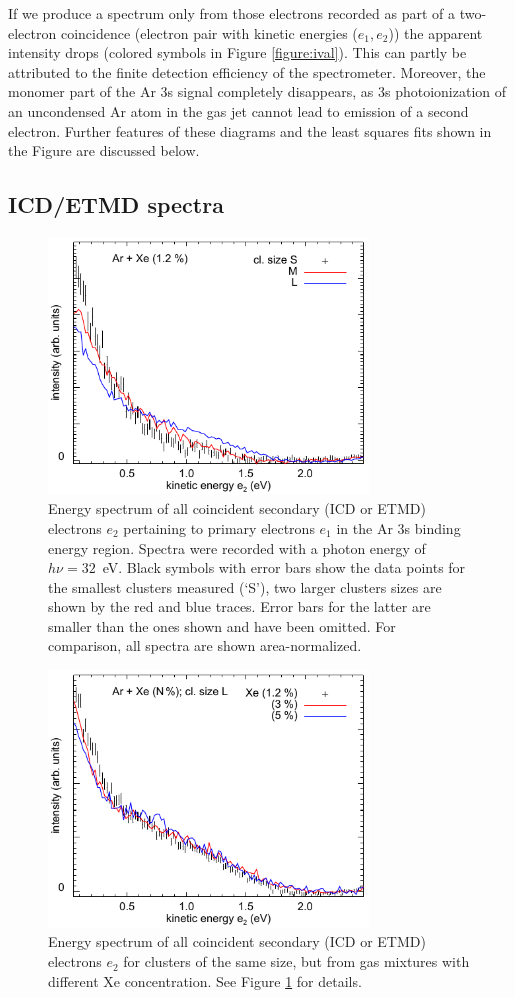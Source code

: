 If we produce a spectrum only from those electrons recorded as part of a two-electron coincidence (electron pair with kinetic energies ($e_1,e_2$)) the apparent intensity drops (colored symbols in Figure \ref{figure:ival}).
This can partly be attributed to the finite detection efficiency of the spectrometer. 
Moreover, the monomer part of the Ar 3s signal completely disappears, as 3s photoionization of an uncondensed Ar atom in the gas jet cannot lead to emission of a second electron. 
Further features of these diagrams and the least squares fits shown in the Figure are discussed below.
%
%
\subsection{ICD/ETMD spectra}
%
\begin{figure}[ht]
 \centering
 \includegraphics[width=8.5cm]{pics/figure_icd_12.pdf}
 \caption{
Energy spectrum of all coincident secondary (ICD or ETMD) electrons $e_2$ pertaining to primary electrons $e_1$ in the Ar 3s binding energy region. 
Spectra were recorded with a photon energy of $h\nu = 32$~eV. 
Black symbols with error bars show the data points for the smallest clusters measured (`S'), two larger clusters sizes are shown by the red and blue traces. 
Error bars for the latter are smaller than the ones shown and have been omitted.
For comparison, all spectra are shown area-normalized. 
}
 \label{figure:icd_12}
\end{figure}
%
%
\begin{figure}[ht]
 \centering
 \includegraphics[width=8.5cm]{pics/figure_icd_l.pdf}
 \caption{
Energy spectrum of all coincident secondary (ICD or ETMD) electrons $e_2$ for clusters of the same size, but from gas mixtures with different Xe concentration. See Figure \protect\ref{figure:icd_12} for details.
}
 \label{figure:icd_l}
\end{figure}
